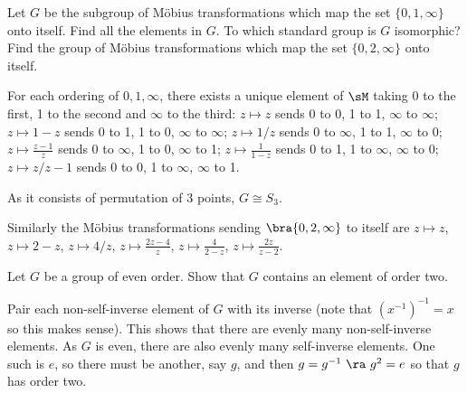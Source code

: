 
\begin{problem}
Let $G$ be the subgroup of M\"obius transformations which map the set $\{0, 1,\infty\}$ onto itself. Find all the elements in $G$. To which standard group is $G$ isomorphic? Find the group of M\"obius transformations which map the set $\{0, 2,\infty\}$ onto itself.
\end{problem}

\begin{solution}[\bf Solution.]
For each ordering of $0,1,\infty$, there exists a unique element of $\sM$ taking 0 to the first, 1 to the second and $\infty$ to the third: $z\mapsto z$ sends 0 to 0, 1 to 1, $\infty$ to $\infty$; $z\mapsto 1-z$ sends 0 to 1, 1 to 0, $\infty$ to $\infty$; $z \mapsto 1/z$ sends 0 to $\infty$, 1 to 1, $\infty$ to 0; $z \mapsto \frac{z-1}z$ sends 0 to $\infty$, 1 to 0, $\infty$ to 1; $z\mapsto \frac 1{1-z}$ sends 0 to 1, 1 to $\infty$, $\infty$ to 0;  $z \mapsto z/{z-1}$ sends 0 to 0, 1 to $\infty$, $\infty$ to 1. 

As it consists of permutation of 3 points, $G\cong S_3$. 

Similarly the M\"obius transformations sending $\bra{0,2,\infty}$ to itself are $z\mapsto z$, $z\mapsto 2-z$, $z\mapsto 4/z$, $z\mapsto \frac{2z-4}z$, $z\mapsto \frac 4{2-z}$, $z\mapsto \frac{2z}{z-2}$.
\end{solution}


\begin{problem}
Let $G$ be a group of even order. Show that $G$ contains an element of order two.
\end{problem}

\begin{solution}[\bf Solution.]
Pair each non-self-inverse element of $G$ with its inverse (note that $(x^{-1})^{-1}=x$ so this makes sense). This shows that there are evenly many non-self-inverse elements. As $G$ is even, there are also evenly many self-inverse elements. One such is $e$, so there must be another, say $g$, and then $g = g^{-1} \ \ra \ g^2 =e$ so that $g$ has order two.
\end{solution}


